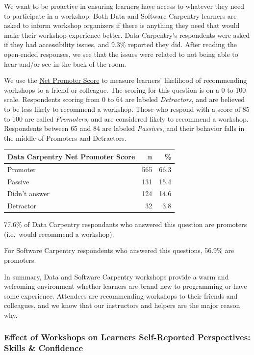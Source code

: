 \documentclass[]{article}
\begin{document}
We want to be proactive in ensuring learners have access to whatever
they need to participate in a workshop. Both Data and Software Carpentry
learners are asked to inform workshop organizers if there is anything
they need that would make their workshop experience better. Data
Carpentry's respondents were asked if they had accessibility issues, and
9.3\% reported they did. After reading the open-ended responses, we see
that the issues were related to not being able to hear and/or see in the
back of the room.

We use the \href{https://en.wikipedia.org/wiki/Net_Promoter}{Net
Promoter Score} to measure learners' likelihood of recommending
workshops to a friend or colleague. The scoring for this question is on
a 0 to 100 scale. Respondents scoring from 0 to 64 are labeled
\emph{Detractors}, and are believed to be less likely to recommend a
workshop. Those who respond with a score of 85 to 100 are called
\emph{Promoters}, and are considered likely to recommend a workshop.
Respondents between 65 and 84 are labeled \emph{Passives}, and their
behavior falls in the middle of Promoters and Detractors.

\begin{longtable}[]{@{}lrr@{}}
\toprule
Data Carpentry Net Promoter Score & n & \%\tabularnewline
\midrule
\endhead
Promoter & 565 & 66.3\tabularnewline
Passive & 131 & 15.4\tabularnewline
Didn't answer & 124 & 14.6\tabularnewline
Detractor & 32 & 3.8\tabularnewline
\bottomrule
\end{longtable}

77.6\% of Data Carpentry respondants who answered this question are
promoters (i.e.~would recommend a workshop).

For Software Carpentry respondents who answered this questions, 56.9\%
are promoters.

In summary, Data and Software Carpentry workshops provide a warm and
welcoming environment whether learners are brand new to programming or
have some experience. Attendees are recommending workshops to their
friends and colleagues, and we know that our instructors and helpers are
the major reason why.

\subsubsection{Effect of Workshops on Learners Self-Reported
Perspectives: Skills \&
Confidence}\label{effect-of-workshops-on-learners-self-reported-perspectives-skills-confidence}
\end{document}

